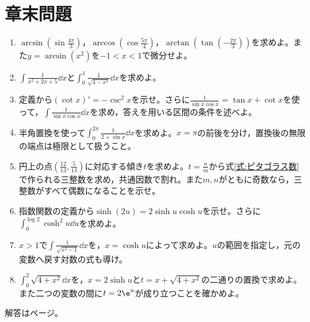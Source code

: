 \section*{章末問題}
\begin{enumerate}[label=\textbf{\thechapter.\arabic*},leftmargin=*]
\item\label{問:逆三角関数の枝}
$\arcsin(\sin\frac{4\pi}3)$，$\arccos(\cos\frac{5\pi}4)$，$\arctan(\tan(-\frac{2\pi}3))$を求めよ。また$y=\arcsin(x^2)$を$-1<x<1$で微分せよ。
\item\label{問:逆三角関数の積分練習}
$\int\frac1{x^2+2x+5}\dd x$と$\int_0^1\frac1{\sqrt{4-x^2}}\dd x$を求めよ。
\item\label{問:余接と正接の和}
定義から$(\cot x)'=-\csc^2x$を示せ。さらに$\frac1{\sin x\cos x}=\tan x+\cot x$を使って，$\int\frac1{\sin x\cos x}\dd x$を求め，答えを用いる区間の条件を述べよ。
\item\label{問:半角置換の区間分割}
半角置換を使って$\int_0^{2\pi}\frac1{2+\sin x}\dd x$を求めよ。$x=\pi$の前後を分け，置換後の無限の端点は極限として扱うこと。
\item\label{問:円の点とピタゴラス数}
円上の点$\left(\frac{12}{13},\frac5{13}\right)$に対応する傾き$t$を求めよ。$t=\frac nm$から式\eqref{式:ピタゴラス数}で作られる三整数を求め，共通因数で割れ。また$m,n$がともに奇数なら，三整数がすべて偶数になることを示せ。
\item\label{問:双曲線二倍角と積分}
指数関数の定義から$\sinh(2u)=2\sinh u\cosh u$を示せ。さらに$\int_0^{\log2}\cosh^2u\dd u$を求めよ。
\item\label{問:双曲線余弦の置換}
$x>1$で$\int\frac1{\sqrt{x^2-1}}\dd x$を，$x=\cosh u$によって求めよ。$u$の範囲を指定し，元の変数へ戻す対数の式も導け。
\item\label{問:双曲線置換と代数置換}
$\int_0^2\sqrt{4+x^2}\dd x$を，$x=2\sinh u$と$t=x+\sqrt{4+x^2}$の二通りの置換で求めよ。また二つの変数の間に$t=2\e^u$が成り立つことを確かめよ。
\end{enumerate}

\smallskip\noindent 解答は\pageref{解答:第10章}ページ。
